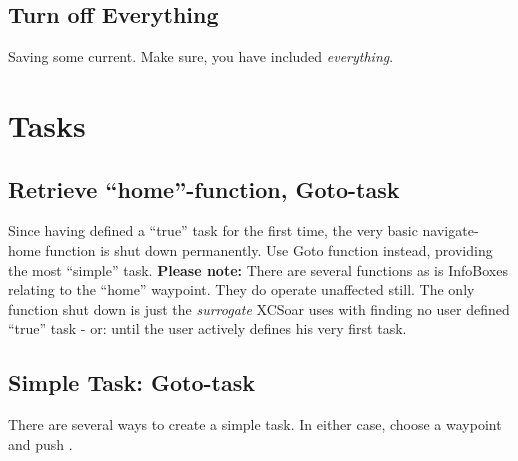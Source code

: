 \documentclass[english,a4paper,12pt]{refrep}
\begin{document}
\subsection*{\textcolor{flashblue}{Turn off Everything}}
Saving some current. Make sure, you have included \emph{everything}.

\section{Tasks}

\subsection{\textcolor{flashblue}{Retrieve ``home''-function, Goto-task}}
Since having defined a ``true'' task for the first time, the very basic navigate-
home function is shut down permanently. Use Goto function instead, providing
the most ``simple'' task. \textbf{Please note:} There are several functions as is 
InfoBoxes relating to the ``home'' waypoint. They do operate unaffected still. 
The only function shut down is just the \emph{surrogate} XCSoar uses with 
finding no user defined ``true'' task - or: until the user actively defines his 
very first task.
\subsection{\textcolor{flashblue}{Simple Task: Goto-task}}
There are several ways to create a simple task. In either case, choose a 
waypoint and push .
\end{document}
